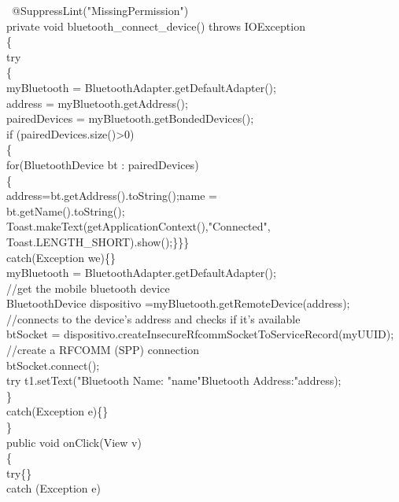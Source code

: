 \documentclass[12pt,a4paper]{report}
\begin{document}
{{{{{{{{\ @SuppressLint("MissingPermission")\\
    private void bluetooth\_connect\_device() throws IOException\\
    \{\\
        try\\
        \{\\
            myBluetooth = BluetoothAdapter.getDefaultAdapter();\\
            address = myBluetooth.getAddress();\\
            pairedDevices = myBluetooth.getBondedDevices();\\
            if (pairedDevices.size()>0)\\
            \{\\
                for(BluetoothDevice bt : pairedDevices)\\
                \{\\
                    address=bt.getAddress().toString();name =\\
                     bt.getName().toString();\\
                    Toast.makeText(getApplicationContext(),"Connected",\\
                     Toast.LENGTH\_SHORT).show();\}\}\} \\
        catch(Exception we)\{\}\\
        myBluetooth = BluetoothAdapter.getDefaultAdapter();\\
        //get the mobile bluetooth device\\
        BluetoothDevice dispositivo =myBluetooth.getRemoteDevice(address);\\
         //connects to the device's address and checks if it's available\\
        btSocket = dispositivo.createInsecureRfcommSocketToServiceRecord(myUUID);\\
        //create a RFCOMM (SPP) connection\\
        btSocket.connect();\\
        try { t1.setText("Bluetooth Name: "name"Bluetooth Address:"address);\\
         \}\\
        catch(Exception e)\{\}\\
    \}\\
    public void onClick(View v)\\
    \{\\
        try\{\}\\
        catch (Exception e)\\
}}}}}}}}}
\end{document}
